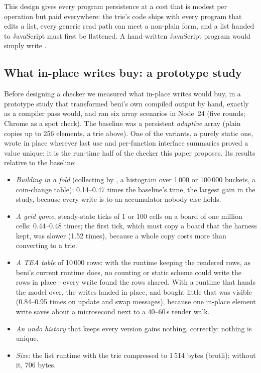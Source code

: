 This design gives every program persistence at a cost that is modest per operation but paid
everywhere: the trie's code ships with every program that edits a list, every generic read path
can meet a non-plain form, and a list handed to JavaScript must first be flattened. A hand-written
JavaScript program would simply write .

\subsection{What in-place writes buy: a prototype study}
\label{sec:bg-measure}

Before designing a checker we measured what in-place writes would buy, in a prototype study that
transformed beni's own compiled output by hand, exactly as a compiler pass would, and ran six array
scenarios in Node~24 (five rounds; Chrome as a spot check). The baseline was a persistent
\emph{adaptive} array (plain copies up to 256 elements, a trie above). One of the variants, a purely
static one, wrote in place wherever last use and per-function interface summaries proved a value
unique; it is the run-time half of the checker this paper proposes. Its results relative to the
baseline:

\begin{itemize}
\item \emph{Building in a fold} (collecting by , a histogram over 1\,000 or 100\,000
buckets, a coin-change table): 0.14--0.47 times the baseline's time, the largest gain in the study,
because every write is to an accumulator nobody else holds.
\item \emph{A grid game}, steady-state ticks of 1 or 100 cells on a board of one million cells:
0.44--0.48 times; the first tick, which must copy a board that the harness kept, was slower
(1.52 times), because a whole copy costs more than converting to a trie.
\item \emph{A TEA table} of 10\,000 rows: with the runtime keeping the rendered rows, as beni's
current runtime does, no counting or static scheme could write the rows in place---every write
found the rows shared. With a runtime that hands the model over, the writes landed in place, and
bought little that was visible (0.84--0.95 times on update and swap messages), because one in-place
element write saves about a microsecond next to a 40--60\,\textmu s render walk.
\item \emph{An undo history} that keeps every version gains nothing, correctly: nothing is unique.
\item \emph{Size}: the list runtime with the trie compressed to 1\,514 bytes (brotli); without it,
706 bytes.
\end{itemize}

